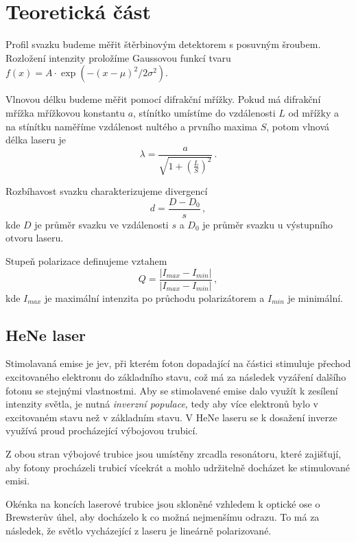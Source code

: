 \section*{Teoretická část}

Profil svazku budeme měřit štěrbinovým detektorem s posuvným šroubem. Rozložení intenzity proložíme Gaussovou funkcí tvaru $f(x)=A\cdot \exp(-(x-\mu)^2/2\sigma^2)$.

Vlnovou délku budeme měřit pomocí difrakční mřížky.
Pokud má difrakční mřížka mřížkovou konstantu $a$, stínítko umístíme do vzdálenosti $L$ od mřížky a na stínítku naměříme vzdálenost nultého a prvního maxima $S$, potom vlnová délka laseru je
\begin{equation} \label{e:vlnovadelka}
\lambda = \frac{a}{\sqrt{1+\left(\frac{L}{S}\right)^2}} \,.
\end{equation}

Rozbíhavost svazku charakterizujeme divergencí \cite{div}
\begin{equation} \label{e:div}
d=\frac{D-D_0}{s} \,,
\end{equation}
kde $D$ je průměr svazku ve vzdálenosti $s$ a $D_0$ je průměr svazku u výstupního otvoru laseru.

Stupeň polarizace definujeme vztahem
\begin{equation} \label{e:pol}
Q=\frac{\left|I_{max} - I_{min}\right|}{\left|I_{max}-I_{min}\right|} \,,
\end{equation}
kde $I_{max}$ je maximální intenzita po průchodu polarizátorem a $I_{min}$ je minimální.

\subsection*{HeNe laser}
Stimolavaná emise je jev, při kterém foton dopadající na částici stimuluje přechod excitovaného elektronu do základního stavu, což má za následek vyzáření dalšího fotonu se stejnými vlastnostmi. Aby se stimolavené emise dalo využít k zesílení intenzity světla, je nutná \emph{inverzní populace}, tedy aby více elektronů bylo v excitovaném stavu než v základním stavu. V HeNe laseru se k dosažení inverze využívá proud procházející výbojovou trubicí.

Z obou stran výbojové trubice jsou umístěny zrcadla resonátoru, které zajišťují, aby fotony procházeli trubicí vícekrát a mohlo udržitelně docházet ke stimulované emisi.

Okénka na koncích laserové trubice jsou skloněné vzhledem k optické ose o Brewsterův úhel, aby docházelo k co možná nejmenšímu odrazu. To má za následek, že světlo vycházející z laseru je lineárně polarizované.